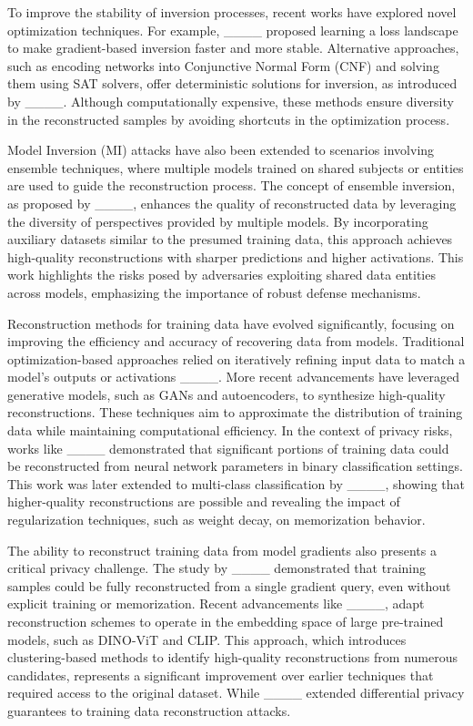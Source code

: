 To improve the stability of inversion processes, recent works have explored novel optimization techniques. For example, ____ proposed learning a loss landscape to make gradient-based inversion faster and more stable. Alternative approaches, such as encoding networks into Conjunctive Normal Form (CNF) and solving them using SAT solvers, offer deterministic solutions for inversion, as introduced by ____. Although computationally expensive, these methods ensure diversity in the reconstructed samples by avoiding shortcuts in the optimization process.

Model Inversion (MI) attacks have also been extended to scenarios involving ensemble techniques, where multiple models trained on shared subjects or entities are used to guide the reconstruction process. The concept of ensemble inversion, as proposed by ____, enhances the quality of reconstructed data by leveraging the diversity of perspectives provided by multiple models. By incorporating auxiliary datasets similar to the presumed training data, this approach achieves high-quality reconstructions with sharper predictions and higher activations. This work highlights the risks posed by adversaries exploiting shared data entities across models, emphasizing the importance of robust defense mechanisms.

Reconstruction methods for training data have evolved significantly, focusing on improving the efficiency and accuracy of recovering data from models. Traditional optimization-based approaches relied on iteratively refining input data to match a model’s outputs or activations ____. More recent advancements have leveraged generative models, such as GANs and autoencoders, to synthesize high-quality reconstructions. These techniques aim to approximate the distribution of training data while maintaining computational efficiency. In the context of privacy risks, works like ____ demonstrated that significant portions of training data could be reconstructed from neural network parameters in binary classification settings. This work was later extended to multi-class classification by ____, showing that higher-quality reconstructions are possible and revealing the impact of regularization techniques, such as weight decay, on memorization behavior.

The ability to reconstruct training data from model gradients also presents a critical privacy challenge. The study by ____ demonstrated that training samples could be fully reconstructed from a single gradient query, even without explicit training or memorization. Recent advancements like ____, adapt reconstruction schemes to operate in the embedding space of large pre-trained models, such as DINO-ViT and CLIP. This approach, which introduces clustering-based methods to identify high-quality reconstructions from numerous candidates, represents a significant improvement over earlier techniques that required access to the original dataset. While ____ extended differential privacy guarantees to training data reconstruction attacks.

